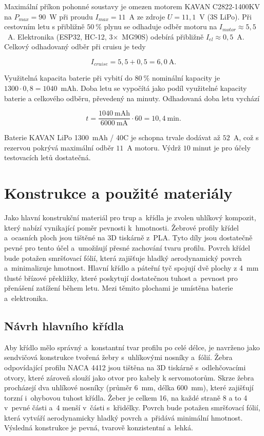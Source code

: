 \documentclass[12pt, a4paper, oneside]{report}
\begin{document}
Maximální příkon pohonné soustavy je omezen motorem KAVAN 
C2822-1400KV na $P_{max} = 90$~W při proudu $I_{max} = 11$~A 
ze zdroje $U = 11{,}1$~V (3S LiPo). Při cestovním letu 
s přibližně $50~\%$ plynu se odhaduje odběr motoru na 
$I_{motor} \approx 5{,}5$~A. Elektronika (ESP32, HC-12, 
3$\times$~MG90S) odebírá přibližně $I_{el} \approx 0{,}5$~A. 
Celkový odhadovaný odběr při cruisu je tedy

\[
I_{cruise} = 5{,}5 + 0{,}5 = 6{,}0~\text{A}.
\]

Využitelná kapacita baterie při vybití do $80~\%$ nominální 
kapacity je $1300 \cdot 0{,}8 = 1040$~mAh. 
Doba letu se vypočítá jako podíl využitelné kapacity baterie a celkového odběru, 
převedený na minuty.
Odhadovaná doba letu vychází

\[
t = \frac{1040~\text{mAh}}{6000~\text{mA}} \cdot 60 = 10{,}4~\text{min} .
\]

Baterie KAVAN LiPo 1300~mAh / 40C je schopna trvale 
dodávat až $52$~A, což s rezervou pokrývá maximální 
odběr $11$~A motoru. Výdrž $10$ minut je pro účely 
testovacích letů dostatečná.

\section{Konstrukce a použité materiály}

Jako hlavní konstrukční materiál pro trup a~křídla je zvolen uhlíkový kompozit,
který nabízí vynikající poměr pevnosti k~hmotnosti. Žebrové profily
křídel a~ocasních ploch jsou tištěné na 3D tiskárně z~PLA.
Tyto díly jsou dostatečně pevné pro tento účel a~umožňují přesné zachování
tvaru profilu. Povrch křídel bude potažen smršťovací fólií, která zajišťuje 
hladký aerodynamický povrch a~minimalizuje hmotnost. Hlavní křídlo a páteřní tyč spojují dvě plochy z 4~mm tlusté břízové překližky, 
které poskytují dostatečnou tuhost a~pevnost pro přenášení zatížení během letu.
Mezi těmito plochami je umístěna baterie a~elektronika.


\subsection{Návrh hlavního křídla}
Aby křídlo mělo správný a~konstantní tvar profilu 
po celé délce, je navrženo jako sendvičová konstrukce tvořená
žebry s~uhlíkovými nosníky a~fólií.
Žebra odpovídající profilu NACA 4412 jsou tištěna na 3D tiskárně
s~odlehčovacími otvory, které zároveň slouží jako otvor pro kabely k servomotorům.
 Skrze žebra procházejí dva uhlíkové nosníky
(průměr 6~mm, délka 600~mm), které zajišťují torzní i~ohybovou tuhost křídla. Žeber je celkem 16,
 na každé straně 8 a to 4 v~pevné části a~4 menší v~části s~křidélky.
Povrch bude potažen smršťovací fólií, která vytváří aerodynamicky hladký povrch
a~přidává minimální hmotnost. Výsledná konstrukce je pevná, tvarově konzistentní
a~lehká.
\end{document}
